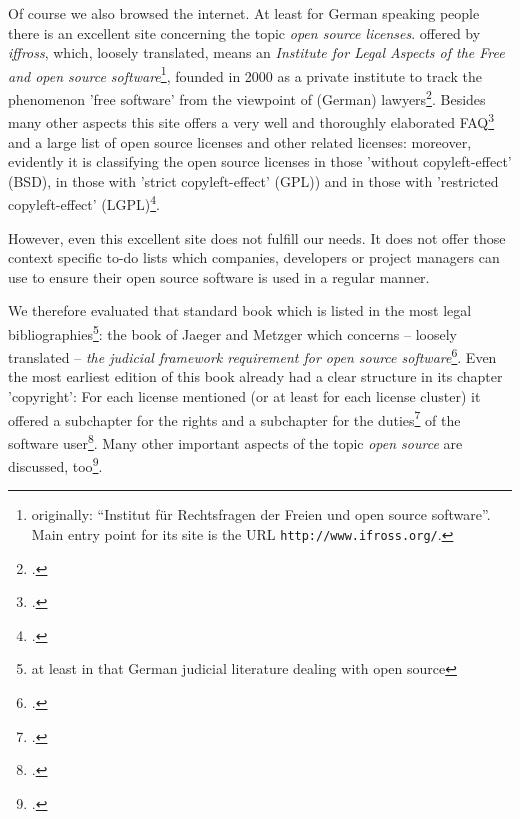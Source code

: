Of course we also browsed the internet. At least for German speaking people
there is an excellent site concerning the topic \emph{open source licenses}.
offered by \textit{iffross}, which, loosely translated, means an
\textit{Institute for Legal Aspects of the Free and open source
software}\footnote{originally: \enquote{Institut für Rechtsfragen der Freien und
open source software}. Main entry point for its site is the URL
\texttt{http://www.ifross.org/}.}, founded in 2000 as a private institute to
track the phenomenon 'free software' from the viewpoint of (German)
lawyers\footcite[cf.][\nopage wp]{ifross2011b}. Besides many other
aspects this site offers a very well and thoroughly elaborated
FAQ\footcite[cf.][\nopage wp]{ifross2011c} and a large list of open
source licenses and other related licenses: moreover, evidently it is
classifying the open source licenses in those 'without copyleft-effect' (BSD),
in those with 'strict copyleft-effect' (GPL)) and in those with 'restricted
copyleft-effect' (LGPL)\footcite[cf.][\nopage wp]{ifross2011a}.

However, even this excellent site does not fulfill our needs. It does not offer
those context specific to-do lists which companies, developers or project
managers can use to ensure their open source software is used in a regular
manner.

We therefore evaluated that standard book which is listed in the most legal
bibliographies\footnote{at least in that German judicial literature dealing with
open source}: the book of Jaeger and Metzger which concerns -- loosely translated
-- \textit{the judicial framework requirement for open source
software}\footcite[cf.][V -- It can not be any surprise that both authors,
Mr. Jaeger and Mr. Metzger are members of ifross (cf.
\texttt{http://www.ifross.org/personen/}, wp)]{JaeMet2002a}. Even the most
earliest edition of this book already had a clear structure in its chapter
'copyright': For each license mentioned (or at least for each license cluster)
it offered a subchapter for the rights and a subchapter for the
duties\footcite[cf.][30ff]{JaeMet2002a} of the software user\footcite[For
getting a good survey of the structure and the line of thought see the contents
cf.][VIIIf]{JaeMet2002a}. Many other important aspects of the topic
\textit{open source} are discussed, too\footcite[pars pro toto: have a
look at the chapter concerning the liability: cf.][137ff]{JaeMet2002a}.

